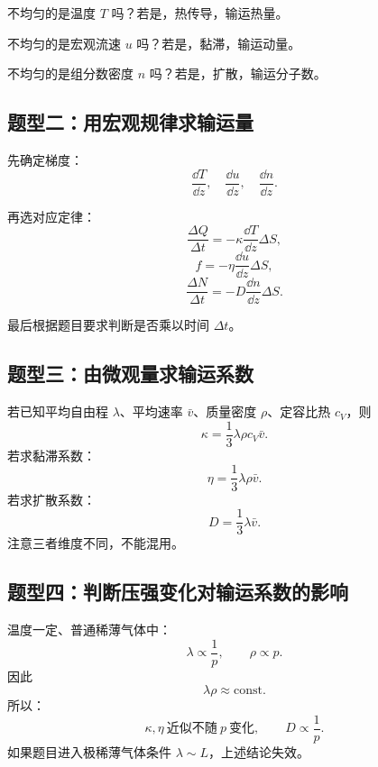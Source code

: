\begin{MethodBox}[三问判断法]
\begin{ReviewList}
  \item 不均匀的是温度 \(T\) 吗？若是，热传导，输运热量。
  \item 不均匀的是宏观流速 \(u\) 吗？若是，黏滞，输运动量。
  \item 不均匀的是组分数密度 \(n\) 吗？若是，扩散，输运分子数。
\end{ReviewList}
\end{MethodBox}

\subsection{题型二：用宏观规律求输运量}

\begin{MethodBox}[通用计算流程]
\begin{ReviewList}
  \item 先确定梯度：
  \[
    \frac{\dd T}{\dd z},\quad
    \frac{\dd u}{\dd z},\quad
    \frac{\dd n}{\dd z}.
  \]
  \item 再选对应定律：
  \[
    \frac{\Delta Q}{\Delta t}
    =
    -\kappa\frac{\dd T}{\dd z}\Delta S,
  \]
  \[
    f
    =
    -\eta\frac{\dd u}{\dd z}\Delta S,
  \]
  \[
    \frac{\Delta N}{\Delta t}
    =
    -D\frac{\dd n}{\dd z}\Delta S.
  \]
  \item 最后根据题目要求判断是否乘以时间 \(\Delta t\)。
\end{ReviewList}
\end{MethodBox}

\subsection{题型三：由微观量求输运系数}

\begin{MethodBox}[输运系数计算]
若已知平均自由程 \(\lambda\)、平均速率 \(\bar v\)、质量密度 \(\rho\)、定容比热 \(c_V\)，则
\[
  \kappa=\frac13\lambda\rho c_V\bar v.
\]
若求黏滞系数：
\[
  \eta=\frac13\lambda\rho\bar v.
\]
若求扩散系数：
\[
  D=\frac13\lambda\bar v.
\]
注意三者维度不同，不能混用。
\end{MethodBox}

\subsection{题型四：判断压强变化对输运系数的影响}

\begin{MethodBox}[压强依赖判断]
温度一定、普通稀薄气体中：
\[
  \lambda\propto\frac1p,
  \qquad
  \rho\propto p.
\]
因此
\[
  \lambda\rho\approx \mathrm{const}.
\]
所以：
\[
  \kappa,\eta\ \text{近似不随}\ p\ \text{变化},
  \qquad
  D\propto\frac1p.
\]
如果题目进入极稀薄气体条件 \(\lambda\sim L\)，上述结论失效。
\end{MethodBox}

